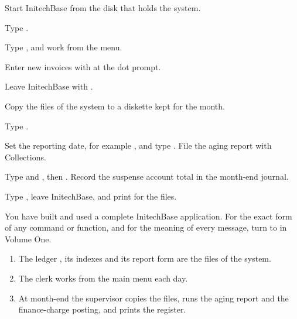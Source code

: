 \begin{Steps}
\item Start InitechBase from the disk that holds the system.
\item Type .
\item Type , and work from the menu.
\item Enter new invoices with  at the dot prompt.
\item Leave InitechBase with .
\end{Steps}

\begin{Steps}[resume]
\item Copy the files of the system to a diskette kept for the month.
\item Type .
\item Set the reporting date, for example , and
  type .  File the aging report with Collections.
\item Type  and , then .
  Record the suspense account total in the month-end journal.
\item Type , leave InitechBase, and
  print  for the files.
\end{Steps}

You have built and used a complete InitechBase application.  For the exact form
of any command or function, and for the meaning of every message, turn to
 in Volume One.

\begin{enumerate}
\item The ledger , its indexes and its report form are the
  files of the system.
\item The clerk works from the main menu each day.
\item At month-end the supervisor copies the files, runs the aging report and the
  finance-charge posting, and prints the register.
\end{enumerate}
